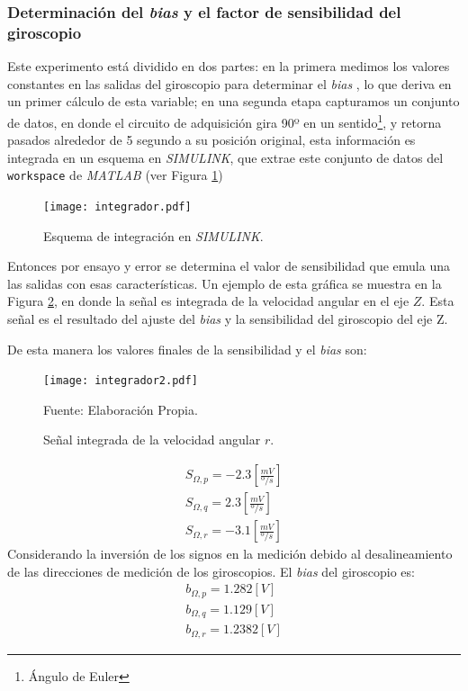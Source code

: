 \documentclass[10pt]{report}
\numberwithin{equation}{chapter}
\numberwithin{algorithm}{chapter}
\newcommand{\bias}{\emph{bias} }
\begin{document}
\subsubsection{Determinación del \bias y el factor de sensibilidad del giroscopio}
Este experimento está dividido en dos partes: en la primera medimos los valores constantes en las salidas del giroscopio para determinar el \bias, lo que deriva en un primer cálculo de esta variable; en una segunda etapa capturamos un conjunto de datos, en donde el circuito de adquisición gira 90º en un sentido\footnote{Ángulo de Euler}, y retorna pasados alrededor de 5 segundo a su posición original, esta información es integrada en un esquema en \textsl{SIMULINK}, que extrae este conjunto de datos del \texttt{workspace} de \textsl{MATLAB} (ver Figura \ref{integrador})
\begin{figure}[t]
\center
\texttt{[image: integrador.pdf]}
\caption{Esquema de integración en \textsl{SIMULINK}.}
\label{integrador}
\end{figure}
Entonces por ensayo y error se determina el valor de sensibilidad que emula una las salidas con esas características. Un ejemplo de esta gráfica se muestra en la Figura \ref{obtencion_fig10}, en donde la señal es integrada de la velocidad angular en el eje $Z$. Esta señal es el resultado del ajuste del \bias y la sensibilidad del giroscopio del eje Z. \par
De esta manera los valores finales de la sensibilidad y el \bias son:
\begin{figure}[t]
\center
\texttt{[image: integrador2.pdf]}
\caption{Señal integrada de la velocidad angular $r$.}
\scriptsize{Fuente: Elaboración Propia.}
\label{obtencion_fig10}
\end{figure}
\begin{gather*}
S_{\Omega,p}=-2.3[\frac{mV}{º/s}]\\
S_{\Omega,q}=2.3[\frac{mV}{º/s}]\\
S_{\Omega,r}=-3.1[\frac{mV}{º/s}]
\end{gather*}
Considerando la inversión de los signos en la medición debido al desalineamiento de las direcciones de medición de los giroscopios. El \bias del giroscopio es:
\begin{gather*}
b_{\Omega,p}=1.282[V]\\
b_{\Omega,q}=1.129[V]\\
b_{\Omega,r}=1.2382[V]
\end{gather*}
\end{document}
